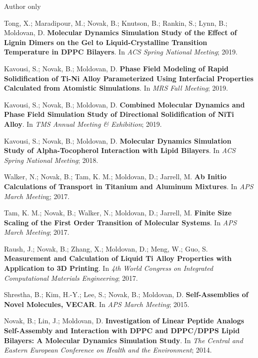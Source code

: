 \begin{cventries}
  \cventry
    {} %
    {Author only} %
    {} %
    {} %
    {
      \begin{cvitems} %
        \item {Tong, X.; Maradipour, M.; Novak, B.; Knutson, B.; Rankin, S.; Lynn, B.; Moldovan, D. \textbf{Molecular Dynamics Simulation Study of the Effect of Lignin Dimers on the Gel to Liquid-Crystalline Transition Temperature in DPPC Bilayers}. In \textit{ACS Spring National Meeting}; 2019.}
        \item {Kavousi, S.; Novak, B.; Moldovan, D. \textbf{Phase Field Modeling of Rapid Solidification of Ti-Ni Alloy Parameterized Using Interfacial Properties Calculated from Atomistic Simulations}. In \textit{MRS Fall Meeting}; 2019.}
        \item {Kavousi, S.; Novak, B.; Moldovan, D. \textbf{Combined Molecular Dynamics and Phase Field Simulation Study of Directional Solidification of NiTi Alloy}. In \textit{TMS Annual Meeting \& Exhibition}; 2019.}
        \item {Kavousi, S.; Novak, B.; Moldovan, D. \textbf{Molecular Dynamics Simulation Study of Alpha-Tocopherol Interaction with Lipid Bilayers}. In \textit{ACS Spring National Meeting}; 2018.}
        \item {Walker, N.; Novak, B.; Tam, K. M.; Moldovan, D.; Jarrell, M. \textbf{Ab Initio Calculations of Transport in Titanium and Aluminum Mixtures}. In \textit{APS March Meetin}g; 2017.}
        \item {Tam, K. M.; Novak, B.; Walker, N.; Moldovan, D.; Jarrell, M. \textbf{Finite Size Scaling of the First Order Transition of Molecular Systems}. In \textit{APS March Meeting}; 2017.}
        \item {Raush, J.; Novak, B.; Zhang, X.; Moldovan, D.; Meng, W.; Guo, S. \textbf{Measurement and Calculation of Liquid Ti Alloy Properties with Application to 3D Printing}. In \textit{4th World Congress on Integrated Computational Materials Engineering}; 2017.}
        \item {Shrestha, B.; Kim, H.-Y.; Lee, S.; Novak, B.; Moldovan, D. \textbf{Self-Assemblies of Novel Molecules, VECAR}. In \textit{APS March Meeting}; 2015.}
        \item {Novak, B.; Lin, J.; Moldovan, D. \textbf{Investigation of Linear Peptide Analogs Self-Assembly and Interaction with DPPC and DPPC/DPPS Lipid Bilayers: A Molecular Dynamics Simulation Study}. In \textit{The Central and Eastern European Conference on Health and the Environment}; 2014.}

\end{cvitems}}
\end{cventries}
